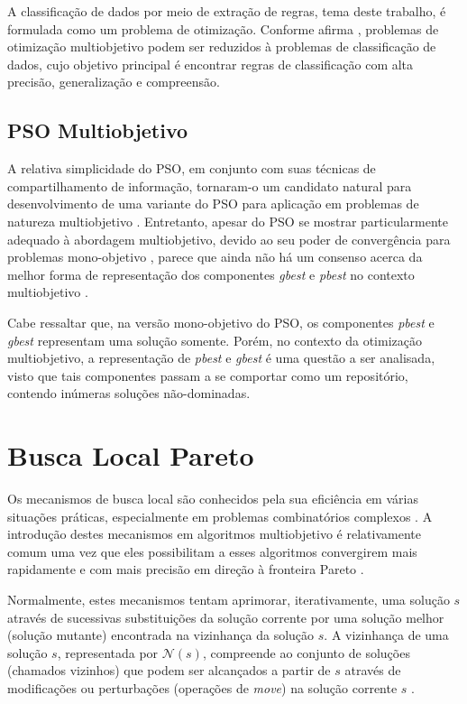 \documentclass[
	12pt,				%
	openany,			%
	oneside,	
	a4paper,			%
	brazil,				%
	]{unimontes-ppgmsc-abntex2}
\begin{document}
A classificação de dados por meio de extração de regras, tema deste trabalho, é formulada como um problema de otimização. Conforme afirma , problemas de otimização multiobjetivo podem ser reduzidos à problemas de classificação de dados, cujo objetivo principal é encontrar regras de classificação com alta precisão, generalização e compreensão. 


\subsection{PSO Multiobjetivo}
\label{sec:pso_mult}

A relativa simplicidade do PSO, em conjunto com suas técnicas de compartilhamento de informação, tornaram-o um candidato natural para desenvolvimento de uma variante do PSO para aplicação em problemas de natureza multiobjetivo \cite{Mishra_2016}. Entretanto, apesar do PSO se mostrar particularmente adequado à abordagem multiobjetivo, devido ao seu poder de convergência para problemas mono-objetivo \cite{Coello_2004}, parece que ainda não há um consenso acerca da melhor forma de representação dos componentes {\em gbest} e {\em pbest} no contexto multiobjetivo \cite{Reddy_2007}. 

Cabe ressaltar que, na versão mono-objetivo do PSO, os componentes {\em pbest} e {\em gbest} representam uma solução somente. Porém, no contexto da otimização multiobjetivo, a representação de {\em pbest} e {\em gbest} é uma questão a ser analisada, visto que tais componentes passam a se comportar como um repositório, contendo inúmeras soluções não-dominadas.

\section{Busca Local Pareto}
\label{sec:busca_local_pareto}

Os mecanismos de busca local são conhecidos pela sua eficiência em várias situações práticas, especialmente em problemas combinatórios complexos \cite{Basseur_2007}. A introdução destes mecanismos em algoritmos multiobjetivo é relativamente comum uma vez que eles possibilitam a esses algoritmos convergirem mais rapidamente e com mais precisão em direção à fronteira Pareto \cite{Joao_2013}.

Normalmente, estes mecanismos tentam aprimorar, iterativamente, uma solução $s$ através de sucessivas substituições da solução corrente por uma solução melhor (solução mutante) encontrada na vizinhança da solução $s$. A vizinhança de uma solução $s$, representada por $\mathcal{N}(s)$, compreende ao conjunto de soluções (chamados vizinhos) que podem ser alcançados a partir de $s$ através de modificações ou perturbações (operações de {\em move}) na solução corrente $s$ \cite{Zachariadis_2010}.
\end{document}
